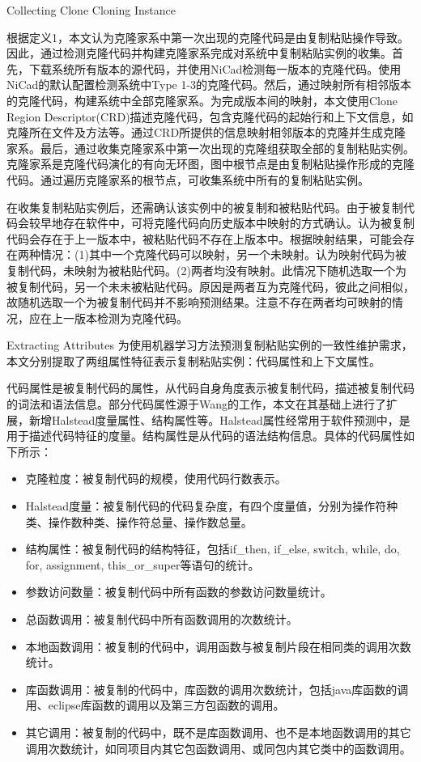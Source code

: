 {Collecting Clone Cloning Instance}

根据定义1，本文认为克隆家系中第一次出现的克隆代码是由复制粘贴操作导致。因此，通过检测克隆代码并构建克隆家系完成对系统中复制粘贴实例的收集。首先，下载系统所有版本的源代码，并使用NiCad检测每一版本的克隆代码。使用NiCad的默认配置检测系统中Type 1-3的克隆代码。然后，通过映射所有相邻版本的克隆代码，构建系统中全部克隆家系。为完成版本间的映射，本文使用Clone Region Descriptor(CRD)\cite{duala2010clone}描述克隆代码，包含克隆代码的起始行和上下文信息，如克隆所在文件及方法等。通过CRD所提供的信息映射相邻版本的克隆并生成克隆家系\cite{ci2013new}。最后，通过收集克隆家系中第一次出现的克隆组获取全部的复制粘贴实例。克隆家系是克隆代码演化的有向无环图，图中根节点是由复制粘贴操作形成的克隆代码。通过遍历克隆家系的根节点，可收集系统中所有的复制粘贴实例。

在收集复制粘贴实例后，还需确认该实例中的被复制和被粘贴代码。由于被复制代码会较早地存在软件中，可将克隆代码向历史版本中映射的方式确认。认为被复制代码会存在于上一版本中，被粘贴代码不存在上版本中。根据映射结果，可能会存在两种情况：(1)其中一个克隆代码可以映射，另一个未映射。认为映射代码为被复制代码，未映射为被粘贴代码。(2)两者均没有映射。此情况下随机选取一个为被复制代码，另一个未未被粘贴代码。原因是两者互为克隆代码，彼此之间相似，故随机选取一个为被复制代码并不影响预测结果。注意不存在两者均可映射的情况，应在上一版本检测为克隆代码。

{Extracting Attributes}
为使用机器学习方法预测复制粘贴实例的一致性维护需求，本文分别提取了两组属性特征表示复制粘贴实例：代码属性和上下文属性。

代码属性是被复制代码的属性，从代码自身角度表示被复制代码，描述被复制代码的词法和语法信息。部分代码属性源于Wang的工作，本文在其基础上进行了扩展，新增Halstead度量属性、结构属性等。Halstead属性经常用于软件预测中，是用于描述代码特征的度量。结构属性是从代码的语法结构信息。具体的代码属性如下所示：
\begin{itemize}
\item 克隆粒度：被复制代码的规模，使用代码行数表示。
\item Halstead度量：被复制代码的代码复杂度，有四个度量值，分别为操作符种类、操作数种类、操作符总量、操作数总量。
\item  结构属性：被复制代码的结构特征，包括if\_then, if\_else, switch, while, do, for, assignment, this\_or\_super等语句的统计。
\item  参数访问数量：被复制代码中所有函数的参数访问数量统计。
\item  总函数调用：被复制代码中所有函数调用的次数统计。
\item  本地函数调用：被复制的代码中，调用函数与被复制片段在相同类的调用次数统计。
\item  库函数调用：被复制的代码中，库函数的调用次数统计，包括java库函数的调用、eclipse库函数的调用以及第三方包函数的调用。
\item  其它调用：被复制的代码中，既不是库函数调用、也不是本地函数调用的其它调用次数统计，如同项目内其它包函数调用、或同包内其它类中的函数调用。
\end{itemize}

